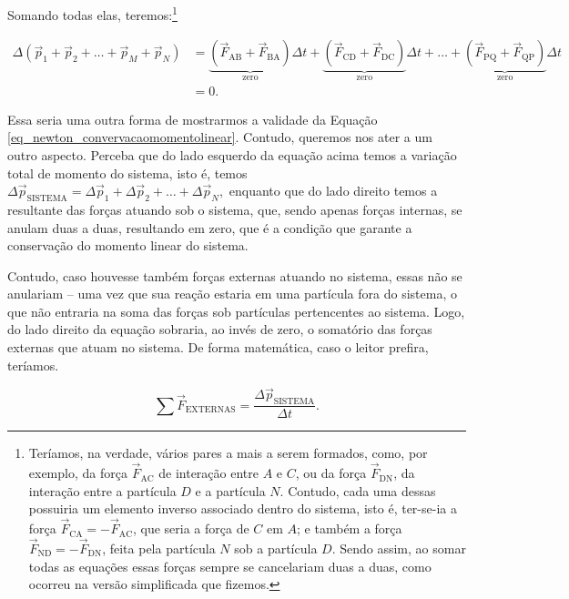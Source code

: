 Somando todas elas, teremos:\footnote{Teríamos, na verdade, vários pares a mais a serem formados, como, por exemplo, da força $\vec F_{\text{AC}}$ de interação entre $A$ e $C$, ou da força $\vec F_{\text{DN}}$, da interação entre a partícula $D$ e a partícula $N$. Contudo, cada uma dessas possuiria um elemento inverso associado dentro do sistema, isto é, ter-se-ia a força $\vec F_{\text{CA}} = - \vec F_{\text{AC}}$, que seria a força de $C$ em $A$; e também a força $\vec F_{\text{ND}} = - \vec F_{\text{DN}}$, feita pela partícula $N$ sob a partícula $D$. Sendo assim, ao somar todas as equações essas forças sempre se cancelariam duas a duas, como ocorreu na versão simplificada que fizemos.}

\begin{align}
     \Delta (\vec p_1 + \vec p_2 +  \dots +\vec p_M + \vec p_N) &= \underbrace{(\vec F_{\text{AB}} + \vec F_{\text{BA}})}_{\text{zero}}  \Delta t + \underbrace{(\vec F_{\text{CD}} + \vec F_{\text{DC}})}_{\text{zero}} \Delta t+ \dots + \underbrace{(\vec F_{\text{PQ}} + \vec F_{\text{QP}})}_{\text{zero}} \Delta t \nonumber \\
     &= 0. \nonumber
\end{align}


Essa seria uma outra forma de mostrarmos a validade da Equação \eqref{eq_newton_convervacaomomentolinear}. Contudo, queremos nos ater a um outro aspecto. Perceba que do lado esquerdo da equação acima temos a variação total de momento do sistema, isto é, temos $\Delta \vec p_{\text{SISTEMA}} =  \Delta \vec p_1 +  \Delta \vec p_2 + \dots +  \Delta \vec p_N,$ enquanto que do lado direito temos a resultante das forças atuando sob o sistema, que, sendo apenas forças internas, se anulam duas a duas, resultando em zero, que é a condição que garante a conservação do momento linear do sistema.

Contudo, caso houvesse também forças externas atuando no sistema, essas não se anulariam -- uma vez que sua reação estaria em uma partícula fora do sistema, o que não entraria na soma das forças sob partículas pertencentes ao sistema. Logo, do lado direito da equação sobraria, ao invés de zero, o somatório das forças externas que atuam no sistema. De forma matemática, caso o leitor prefira, teríamos.

\begin{equation}
    \sum \vec F_{\text{EXTERNAS}} = \dfrac{\Delta \vec p_{\text{SISTEMA}}}{\Delta t} .
    \label{eq_newton_segundaleisistemaparticulas}
\end{equation}

